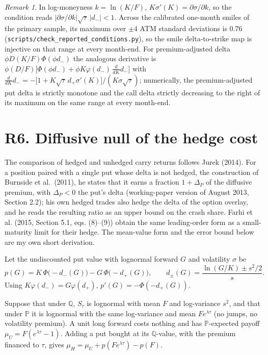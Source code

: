 \documentclass[11pt]{article}
\theoremstyle{remark}
\newtheorem{remark}[proposition]{Remark}
\newcommand{\Q}{\mathbb{Q}}
\renewcommand{\P}{\mathbb{P}}
\begin{document}
\begin{remark}
In log-moneyness $k=\ln(K/F)$, $K\sigma'(K)=\partial\sigma/\partial k$, so the condition reads $|\partial\sigma/\partial k|\sqrt\tau\,|d_-|<1$. Across the calibrated one-month smiles of the primary sample, its maximum over $\pm4$ ATM standard deviations is $0.76$ (\texttt{scripts/check\_reported\_conditions.py}), so the smile delta-to-strike map is injective on that range at every month-end. For premium-adjusted delta $\phi D(K/F)\Phi(\phi d_-)$ the analogous derivative is $\phi(D/F)\bigl[\Phi(\phi d_-)+\phi K\varphi(d_-)\,\tfrac{d}{dK}d_-\bigr]$ with $\tfrac{d}{dK}d_-=-\bigl[1+K\sqrt\tau\,d_+\sigma'(K)\bigr]/(K\sigma\sqrt\tau)$; numerically, the premium-adjusted put delta is strictly monotone and the call delta strictly decreasing to the right of its maximum on the same range at every month-end.
\end{remark}

\section*{R6. Diffusive null of the hedge cost}

The comparison of hedged and unhedged carry returns follows Jurek (2014). For a position paired with a single put whose delta is not hedged, the construction of Burnside et al.\ (2011), he states that it earns a fraction $1+\Delta_P$ of the diffusive premium, with $\Delta_P<0$ the put's delta (working-paper version of August 2013, Section 2.2); his own hedged trades also hedge the delta of the option overlay, and he reads the resulting ratio as an upper bound on the crash share. Farhi et al. (2015, Section 5.1, eqs. (8)--(9)) obtain the same leading-order form as a small-maturity limit for their hedge. The mean-value form and the error bound below are my own short derivation.

Let the undiscounted put value with lognormal forward $G$ and volatility $\sigma$ be
\[
p(G)=K\,\Phi\bigl(-d_-(G)\bigr)-G\,\Phi\bigl(-d_+(G)\bigr),\qquad d_\pm(G)=\frac{\ln(G/K)\pm s^2/2}{s}.
\]
Using $K\varphi(d_-)=G\varphi(d_+)$, $p'(G)=-\Phi(-d_+(G))$.

Suppose that under $\Q$, $S_\tau$ is lognormal with mean $F$ and log-variance $s^2$, and that under $\P$ it is lognormal with the same log-variance and mean $Fe^{\lambda\tau}$ (no jumps, no volatility premium). A unit long forward costs nothing and has $\P$-expected payoff $\mu_U=F(e^{\lambda\tau}-1)$. Adding a put bought at its $\Q$-value, with the premium financed to $\tau$, gives $\mu_H=\mu_U+p(Fe^{\lambda\tau})-p(F)$.
\end{document}
